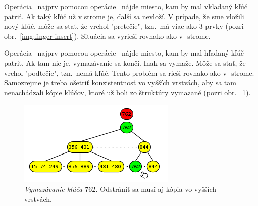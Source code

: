 
Operácia \ins\ najprv pomocou operácie \find\ nájde miesto, kam by mal vkladaný kľúč patriť. 
Ak taký kľúč už v strome je, ďalší sa nevloží. V prípade, že sme vložili nový kľúč, môže sa stať, 
že vrchol "pretečie", tzn.\ má viac ako 3 prvky%
(pozri obr.~\ref{img:finger-insert}). Situácia sa vyrieši rovnako ako v \Bp-strome. 

Operácia \delete\ najprv pomocou operácie \find\ nájde miesto, kam by mal hľadaný kľúč patriť. 
Ak tam nie je, vymazávanie sa končí. Inak sa vymaže. Môže sa stať, že vrchol "podtečie", tzn.\ 
nemá kľúč. Tento problém sa rieši rovnako ako v \Bp-strome. 
Samozrejme je treba ošetriť konzistentnosť vo vyšších vrstvách, aby sa tam nenachádzali kópie 
kľúčov, ktoré už boli zo štruktúry vymazané (pozri obr. ~\ref{img:finger-delete}).  

\begin{figure}
\includegraphics[width=\columnwidth]{obrazky/finger-delete.png}
\caption{\emph{Vymazávanie kľúča $762$.} Odstrániť sa musí aj kópia vo vyšších vrstvách.}
\label{img:finger-delete}
\end{figure}

